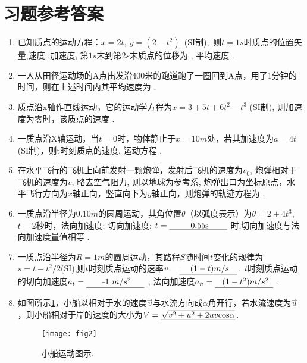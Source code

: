 \section{习题参考答案}
\begin{enumerate}
    \item 已知质点的运动方程：$x =2t,\ y =(2-t^2)$\ (SI制),\ 则$t=1s$时质点的位置矢量,速度 ,加速度, 第$1s$末到第$2s$末质点的位移为
    , 平均速度 .
    \item 一人从田径运动场的A点出发沿400米的跑道跑了一圈回到A点，用了1分钟的时间，则在上述时间内其平均速度为 .
    \item 质点沿x轴作直线运动，它的运动学方程为$x = 3+5t+6t^2-t^3$ (SI制), 则加速度为零时，该质点的速度 .
    \item 一质点沿X轴运动，当$t=0$时，物体静止于$x=10m$处，若其加速度为$a=4t$(SI制)，则t时刻质点的速度, 运动方程 .
    \item 在水平飞行的飞机上向前发射一颗炮弹，发射后飞机的速度为$v_0$, 炮弹相对于飞机的速度为$v$, 略去空气阻力, 则以地球为参考系, 炮弹出口为坐标原点，水平飞行方向为$x$轴正向，竖直向下为$y$轴正向，则炮弹的轨迹方程为  .
    \item 一质点沿半径为$0.10m$的圆周运动，其角位置$\theta$（以弧度表示）为$\theta=2+4t^3$,\ $t=2$秒时，法向加速度; 切向加速度; $t = \anl{0.55s}$ 时,切向加速度与法向加速度量值相等 .
    \item 一质点沿半径为$R=1m$的圆周运动，其路程$S$随时间$t$变化的规律为$s=t-t^2/2$(SI),则$t$时刻质点运动的速率$v=\anl{$(1-t) m/s$}$.\ $t$时刻质点运动的切向加速度$a_t=\anl{-1 $m/s^2$}$ ; 法向加速度$a_n=\anl{$(1-t^2) m/s^2$}$ .
    \item 如图所示\ref{Fig:2}，小船以相对于水的速度$\vec{v}$与水流方向成$\alpha$角开行，若水流速度为$\vec{u}$，则小船相对于岸的速度的大小为$V=\underline{\makebox[9em]{$\sqrt{v^2+u^2+2uv\mathrm{cos}\alpha}$}}$.
    \begin{figure}[h]
        \centering
        \texttt{[image: fig2]}
        \caption{小船运动图示.}\label{Fig:2}
    \end{figure}
\end{enumerate}
